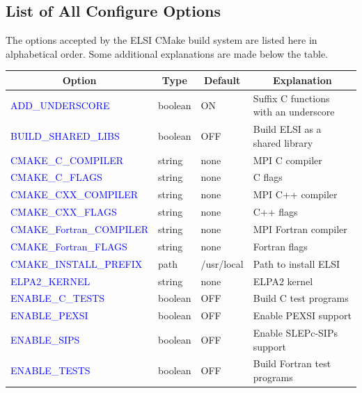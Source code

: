 \documentclass{report}
\begin{document}
\subsection{List of All Configure Options}
\label{subsec:config_keywords}
The options accepted by the ELSI CMake build system are listed here in alphabetical order.  Some additional explanations are made below the table.\\

\begin{tabular}[]{|p{50mm}|p{15mm}|p{20mm}|p{80mm}|}
\hline
\multicolumn{1}{|c|}{\textbf{Option}} & \multicolumn{1}{c|}{\textbf{Type}} & \multicolumn{1}{c|}{\textbf{Default}} & \multicolumn{1}{c|}{\textbf{Explanation}}\\
\hline
\textcolor{blue}{ADD\_UNDERSCORE}            & boolean & ON          & Suffix C functions with an underscore\\
\hline
\textcolor{blue}{BUILD\_SHARED\_LIBS}        & boolean & OFF         & Build ELSI as a shared library\\
\hline
\textcolor{blue}{CMAKE\_C\_COMPILER}         & string  & none        & MPI C compiler\\
\hline
\textcolor{blue}{CMAKE\_C\_FLAGS}            & string  & none        & C flags\\
\hline
\textcolor{blue}{CMAKE\_CXX\_COMPILER}       & string  & none        & MPI C++ compiler\\
\hline
\textcolor{blue}{CMAKE\_CXX\_FLAGS}          & string  & none        & C++ flags\\
\hline
\textcolor{blue}{CMAKE\_Fortran\_COMPILER}   & string  & none        & MPI Fortran compiler\\
\hline
\textcolor{blue}{CMAKE\_Fortran\_FLAGS}      & string  & none        & Fortran flags\\
\hline
\textcolor{blue}{CMAKE\_INSTALL\_PREFIX}     & path    & /usr/local  & Path to install ELSI\\
\hline
\textcolor{blue}{ELPA2\_KERNEL}              & string  & none        & ELPA2 kernel\\
\hline
\textcolor{blue}{ENABLE\_C\_TESTS}           & boolean & OFF         & Build C test programs\\
\hline
\textcolor{blue}{ENABLE\_PEXSI}              & boolean & OFF         & Enable PEXSI support\\
\hline
\textcolor{blue}{ENABLE\_SIPS}               & boolean & OFF         & Enable SLEPc-SIPs support\\
\hline
\textcolor{blue}{ENABLE\_TESTS}              & boolean & OFF         & Build Fortran test programs\\

\end{tabular}
\end{document}
